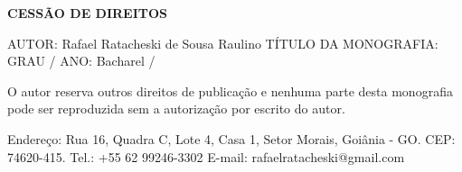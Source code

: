 \begin{minipage}{.9\textwidth}
        \textbf{CESSÃO DE DIREITOS}
	    \vspace{0.5cm}
	    
        AUTOR: Rafael Ratacheski de Sousa Raulino
        TÍTULO DA MONOGRAFIA: {\imprimirtitulo} 
        GRAU / ANO: Bacharel / {\imprimirdata} 
        
        O autor reserva outros direitos de publicação e nenhuma parte desta monografia pode ser reproduzida sem a autorização por escrito do autor.
        
	    \vspace{0.5cm}
        \begin{center}
            \begin{minipage}{.45\textwidth}
            \begin{center}
                {\imprimirautor}
            \end{center}
            \footnotesize{Endereço: Rua 16, Quadra C, Lote 4, Casa 1, Setor Morais, Goiânia - GO.} 
            \footnotesize{CEP: 74620-415.} 
            \footnotesize{Tel.: +55 62 99246-3302} 
            \footnotesize{E-mail: rafaelratacheski@gmail.com}
            \end{minipage}
        \end{center}
\end{minipage}